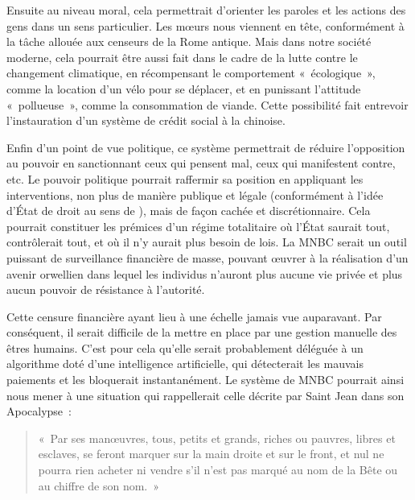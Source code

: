 Ensuite au niveau moral, cela permettrait d'orienter les paroles et les actions des gens dans un sens particulier. Les mœurs nous viennent en tête, conformément à la tâche allouée aux censeurs de la Rome antique. Mais dans notre société moderne, cela pourrait être aussi fait dans le cadre de la lutte contre le changement climatique, en récompensant le comportement «~écologique~», comme la location d'un vélo pour se déplacer, et en punissant l'attitude «~pollueuse~», comme la consommation de viande. Cette possibilité fait entrevoir l'instauration d'un système de crédit social à la chinoise.

Enfin d'un point de vue politique, ce système permettrait de réduire l'opposition au pouvoir en sanctionnant ceux qui pensent mal, ceux qui manifestent contre, etc. Le pouvoir politique pourrait raffermir sa position en appliquant les interventions, non plus de manière publique et légale (conformément à l'idée d'État de droit au sens de ), mais de façon cachée et discrétionnaire. Cela pourrait constituer les prémices d'un régime totalitaire où l'État saurait tout, contrôlerait tout, et où il n'y aurait plus besoin de lois. La MNBC serait un outil puissant de surveillance financière de masse, pouvant œuvrer à la réalisation d'un avenir orwellien dans lequel les individus n'auront plus aucune vie privée et plus aucun pouvoir de résistance à l'autorité.

Cette censure financière ayant lieu à une échelle jamais vue auparavant. Par conséquent, il serait difficile de la mettre en place par une gestion manuelle des êtres humains. C'est pour cela qu'elle serait probablement déléguée à un algorithme doté d'une intelligence artificielle, qui détecterait les mauvais paiements et les bloquerait instantanément. Le système de MNBC pourrait ainsi nous mener à une situation qui rappellerait celle décrite par Saint Jean dans son Apocalypse~:

\begin{quote}
«~Par ses manœuvres, tous, petits et grands, riches ou pauvres, libres et esclaves, se feront marquer sur la main droite et sur le front, et nul ne pourra rien acheter ni vendre s'il n'est pas marqué au nom de la Bête ou au chiffre de son nom.~»
\end{quote}

